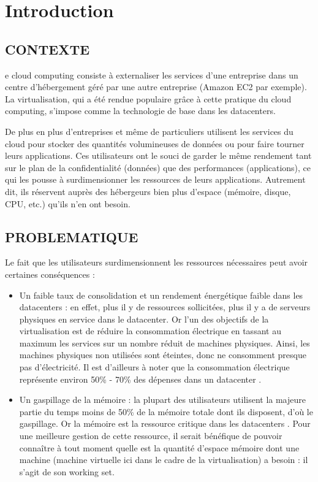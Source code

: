 %
%
\let\textcircled=\pgftextcircled
\chapter*{Introduction}
\label{chap:intro}
\section*{CONTEXTE}

e cloud computing consiste à externaliser les services d’une entreprise dans un centre d’hébergement géré par une autre entreprise (Amazon EC2 par exemple). La virtualisation, qui a été rendue populaire grâce à cette pratique du cloud computing, s'impose comme la technologie de base dans les datacenters.
\par\noindent De plus en plus d'entreprises et même de particuliers utilisent les services du cloud pour stocker des quantités volumineuses de données ou pour faire tourner leurs applications. Ces utilisateurs ont le souci de garder le même rendement tant sur le plan de la confidentialité (données) que des performances (applications), ce qui les pousse à surdimensionner les ressources de leurs applications. Autrement dit, ils réservent auprès des hébergeurs bien plus d'espace (mémoire, disque, CPU, etc.) qu'ils n'en ont besoin.

\section*{PROBLEMATIQUE}

Le fait que les utilisateurs surdimensionnent les ressources nécessaires peut avoir certaines conséquences :

\begin{itemize}[label=, font=\large \color{darkorange}]
    \item Un faible taux de consolidation et un rendement énergétique faible dans les datacenters :  en effet, plus il y de ressources sollicitées, plus il y a de serveurs physiques en service dans le datacenter. Or l'un des objectifs de la virtualisation est de réduire la consommation électrique en tassant au maximum les services sur un nombre réduit de machines physiques. Ainsi, les machines physiques non utilisées sont éteintes, donc ne consomment presque pas d’électricité. Il est d'ailleurs à noter que la consommation électrique représente environ 50\% - 70\% des dépenses dans un datacenter \cite{article1}.
    \item Un gaspillage de la mémoire : la plupart des utilisateurs utilisent la majeure partie du temps moins de 50\% de la mémoire totale dont ils disposent, d'où le gaspillage. Or la mémoire est la ressource critique dans les datacenters \cite{article2}. Pour une meilleure gestion de cette ressource, il serait bénéfique de pouvoir connaître à tout moment quelle est la quantité d'espace mémoire dont une machine (machine virtuelle ici dans le cadre de la virtualisation) a besoin : il s'agit de son working set.
\end{itemize}

